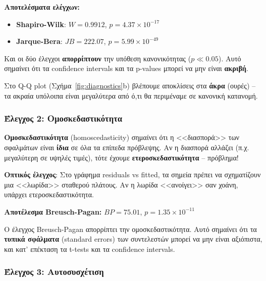 \documentclass[12pt,a4paper]{article}
\begin{document}
\textbf{Αποτελέσματα ελέγχων:}
\begin{itemize}
    \item \textbf{Shapiro-Wilk}: $W = 0.9912$, $p = 4.37 \times 10^{-17}$
    \item \textbf{Jarque-Bera}: $JB = 222.07$, $p = 5.99 \times 10^{-49}$
\end{itemize}

\begin{warningbox}
Και οι δύο έλεγχοι \textbf{απορρίπτουν} την υπόθεση κανονικότητας ($p \ll 0.05$). Αυτό σημαίνει ότι τα confidence intervals και τα p-values μπορεί να μην είναι \textbf{ακριβή}.

Στο Q-Q plot (Σχήμα~\ref{fig:diagnostics}b) βλέπουμε αποκλίσεις στα \textbf{άκρα} (ουρές) -- τα ακραία υπόλοιπα είναι μεγαλύτερα από ό,τι θα περιμέναμε σε κανονική κατανομή.
\end{warningbox}

\subsubsection{Έλεγχος 2: Ομοσκεδαστικότητα}

\begin{theorybox}
\textbf{Ομοσκεδαστικότητα} (homoscedasticity) σημαίνει ότι η <<διασπορά>> των σφαλμάτων είναι \textbf{ίδια} σε όλα τα επίπεδα πρόβλεψης. Αν η διασπορά αλλάζει (π.χ. μεγαλύτερη σε υψηλές τιμές), τότε έχουμε \textbf{ετεροσκεδαστικότητα} -- πρόβλημα!

\textbf{Οπτικός έλεγχος}: Στο γράφημα residuals vs fitted, τα σημεία πρέπει να σχηματίζουν μια <<λωρίδα>> σταθερού πλάτους. Αν η λωρίδα <<ανοίγει>> σαν χοάνη, υπάρχει ετεροσκεδαστικότητα.
\end{theorybox}

\textbf{Αποτέλεσμα Breusch-Pagan:} $BP = 75.01$, $p = 1.35 \times 10^{-11}$

\begin{warningbox}
Ο έλεγχος Breusch-Pagan απορρίπτει την ομοσκεδαστικότητα. Αυτό σημαίνει ότι τα \textbf{τυπικά σφάλματα} (standard errors) των συντελεστών μπορεί να μην είναι αξιόπιστα, και κατ' επέκταση τα t-tests και τα confidence intervals.
\end{warningbox}

\subsubsection{Έλεγχος 3: Αυτοσυσχέτιση}
\end{document}
